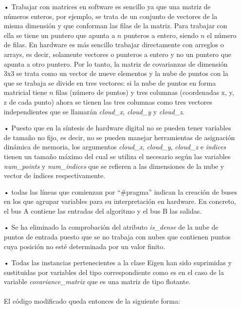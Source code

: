 \begin{itemize}
\item[•] Trabajar con matrices en software es sencillo ya que una matriz de números enteros, por ejemplo, se trata de un conjunto de vectores de la misma dimensión y que conforman las filas de la matriz. Para trabajar con ella se tiene un puntero que apunta a $n$ punteros a entero, siendo $n$ el número de filas. En hardware es más sencillo trabajar directamente con arreglos o arrays, es decir, solamente vectores o punteros a entero y no un puntero que apunta a otro puntero. Por lo tanto, la matriz de covarianzas de dimensión 3x3 se trata como un vector de nueve elementos y la nube de puntos con la que se trabaja se divide en tres vectores: si la nube de puntos en forma matricial tiene $n$ filas (número de puntos) y tres columnas (coordenadas x, y, z de cada punto) ahora se tienen las tres columnas como tres vectores independientes que se llamarán \textit{cloud\_x}, \textit{cloud\_y} y \textit{cloud\_z}.

\item[•] Puesto que en la síntesis de hardware digital no se pueden tener variables de tamaño no fijo, es decir, no se pueden manejar herramientas de asignación dinámica de memoria, los argumentos \textit{cloud\_x}, \textit{cloud\_y}, \textit{cloud\_z} e \textit{indices} tienen un tamaño máximo del cual se utiliza el necesario según las variables \textit{num\_points} y \textit{num\_indices} que se refieren a las dimensiones de la nube y vector de índices respectivamente.

\item[•] todas las líneas que comienzan por ``\#pragma'' indican la creación de buses en los que agrupar variables para su interpretación en hardware. En concreto, el bus A contiene las entradas del algoritmo y el bus B las salidas. 

\item[•] Se ha eliminado la comprobación del atributo \textit{is\_dense} de la nube de puntos de entrada puesto que se no trabaja con nubes que contienen puntos cuya posición no esté determinada por un valor finito.

\item[•] Todas las instancias pertenecientes a la clase Eigen han sido suprimidas y sustituidas por variables del tipo correspondiente como es en el caso de la variable \textit{covariance\_matrix} que es una matriz de tipo flotante.
\\
\\
El código modificado queda entonces de la siguiente forma:
\end{itemize}

